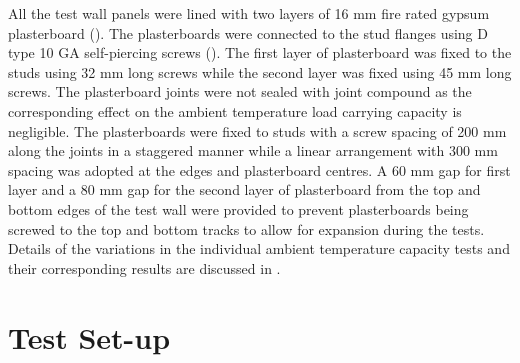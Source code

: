 All the test wall panels were lined with two layers of 16 mm fire rated gypsum plasterboard (). The plasterboards were connected to the stud flanges using D type 10 GA self-piercing screws (). The first layer of plasterboard was fixed to the studs using 32 mm long screws while the second layer was fixed using 45 mm long screws. The plasterboard joints were not sealed with joint compound as the corresponding effect on the ambient temperature load carrying capacity is negligible. The plasterboards were fixed to studs with a screw spacing of 200 mm along the joints in a staggered manner while a linear arrangement with 300 mm spacing was adopted at the edges and plasterboard centres. A 60 mm gap for first layer and a 80 mm gap for the second layer of plasterboard from the top and bottom edges of the test wall were provided to prevent plasterboards being screwed to the top and bottom tracks to allow for expansion during the tests. Details of the variations in the individual ambient temperature capacity tests and their corresponding results are discussed in .

\section{Test Set-up}

